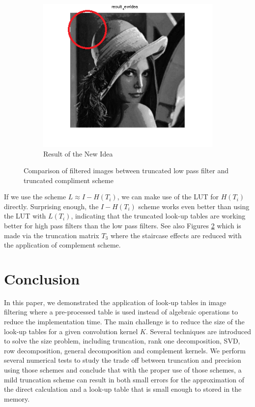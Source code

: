 \documentclass[12pt]{amsart}
\theoremstyle{definition}
\theoremstyle{remark}
\numberwithin{thm}{section}
\begin{document}
\begin{figure}[h]
\begin{subfigure}[b]{0.3\textwidth} \includegraphics[width=\textwidth]{new.png} \caption{Result of the New Idea} \label{fig:new} \end{subfigure}
\caption{Comparison of filtered images between truncated low pass filter and truncated compliment scheme}\label{fig:comp} 
\end{figure}

If we use the scheme $L\approx I-H(T_i)$, we can make use of the LUT for $H(T_i)$ directly. Surprising enough, the $I-H(T_i)$ scheme works even better than using the LUT with $L(T_i)$, indicating that the truncated look-up tables are working better for high pass filters than the low pass filters. See also Figures \ref{fig:comp} which is made via the truncation matrix $T_3$ where the staircase effects are reduced with the application of complement scheme. 

\section{Conclusion}
In this paper, we demonstrated the application of look-up tables in image filtering where a pre-processed table is used instead of algebraic operations to reduce the implementation time. The main challenge is to reduce the size of the look-up tables for a given convolution kernel $K$. Several techniques are introduced to solve the size problem, including truncation, rank one decomposition, SVD, row decomposition, general decomposition and complement kernels. We perform several numerical tests to study the trade off between truncation and precision using those schemes and conclude that with the proper use of those schemes, a mild truncation scheme can result in both small errors for the approximation of the direct calculation and a look-up table that is small enough to stored in the memory. 
\end{document}
